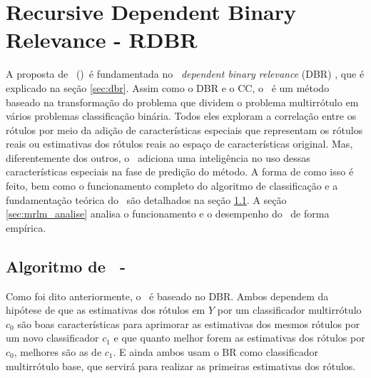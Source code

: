 \chapter{Recursive Dependent Binary Relevance - RDBR}
A proposta de \MRLM~(\MRLMa)~é fundamentada no \MML~\textit{dependent binary relevance} (DBR) \cite{dbr2014}, que é explicado
na seção \ref{sec:dbr}. Assim como o DBR e o CC, o \MRLMa~é um método baseado na transformação do problema que dividem o problema
multirrótulo em vários problemas classificação binária. Todos eles exploram a correlação entre os rótulos por meio da adição de
características especiais que representam os rótulos reais ou estimativas dos rótulos reais ao espaço de características original. 
Mas, diferentemente dos outros, o \MRLMa~adiciona uma inteligência no uso dessas características especiais na fase de predição do método.
A forma de como isso é feito, bem como o funcionamento completo do algoritmo de classificação e a fundamentação teórica
do \MRLMa~são detalhados na seção \ref{sec:mrlm_algo}. 
A seção \ref{sec:mrlm_analise} analisa o funcionamento e o desempenho do \MRLMa~de forma empírica.


\section{Algoritmo de \MRLM~-~\MRLMa}
\label{sec:mrlm_algo}
Como foi dito anteriormente, o \MRLM~é baseado no DBR. 
Ambos dependem da hipótese de que as estimativas dos rótulos em $Y$ por um classificador multirrótulo $c_0$
são boas características para aprimorar as estimativas dos mesmos rótulos por um novo classificador $c_1$
e que quanto melhor forem as estimativas dos rótulos por $c_0$, melhores são as de $c_1$.
E ainda ambos usam o BR como classificador multirrótulo base, que servirá para realizar as primeiras estimativas dos 
rótulos.


